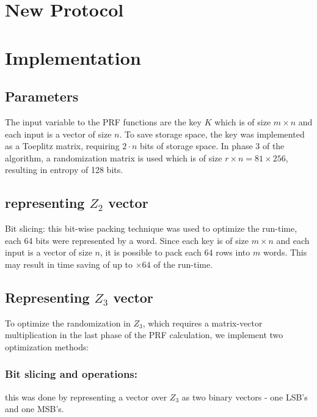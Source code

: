 \section{New Protocol}





\section{Implementation}
\label{sec:technical_overview}





\subsection{Parameters}
The input variable to the PRF functions are the key $K$ which is of size $m \times n$ and each input is a vector of size $n$. 
To save storage space, the key was implemented as a Toeplitz matrix, requiring $2 \cdot n$ bits of storage space.
In phase 3 of the algorithm, a randomization matrix is used which is of size $r \times n = 81 \times 256$, resulting in entropy of 128 bits.

\subsection{representing $Z_2$ vector}

Bit slicing: this bit-wise packing technique was used to optimize the run-time, each 64 bits were represented by a word. Since each key is of size $m \times n$ and each input is a vector of size $n$, it is possible to pack each 64 rows into $m$ words. This may result in time saving of up to $\times 64$ of the run-time.

\subsection{Representing $Z_3$ vector}

To optimize the randomization in $Z_3$, which requires a matrix-vector multiplication in the last phase of the PRF calculation, we implement two optimization methods:

\subsubsection{Bit slicing and operations:} this was done by representing a vector over $Z_3$  as two binary vectors - one LSB's and one MSB's. 

